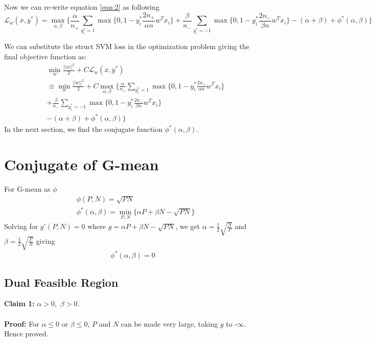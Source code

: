 \documentclass{article} %
\begin{document}
Now we can re-write equation \ref{eqn:2} as following
\begin{equation*}
\mathcal L_w(\overline{x},\overline{y}^*) = \max_{\alpha,\beta}\{
\frac{\alpha}{n_+}\sum_{y_i^*=1}\max\{0,1-y_i^*\frac{2n_+}{\alpha n}w^Tx_i\}+\frac{\beta}{n_-}\sum_{y_i^*=-1}\max\{0,1-y_i^*\frac{2n_-}{\beta n}w^Tx_i\}-(\alpha+\beta)+\phi^*(\alpha,\beta)\}
\end{equation*}

We can substitute the struct SVM loss in the optimization problem giving the final objective function as:
\begin{equation*}
\begin{split}
	&\min_w \frac{||w||^2}{2} + C \mathcal L_w(\overline{x},\overline{y}^*)\\
	&\equiv \min_w \frac{||w||^2}{2} + C\max_{\alpha,\beta}\{
	\frac{\alpha}{n_+}\sum_{y_i^*=1}\max\{0,1-y_i^*\frac{2n_+}{\alpha n}w^Tx_i\}\\
	&+ \frac{\beta}{n_-}\sum_{y_i^*=-1}\max\{0,1-y_i^*\frac{2n_-}{\beta n}w^Tx_i\}\\
	&-(\alpha+\beta)+\phi^*(\alpha,\beta)\}
\end{split}
\end{equation*}
In the next section, we find the conjugate function $\phi^*(\alpha,\beta)$.
\section{Conjugate of G-mean}
For G-mean as $\phi$
\begin{align*}
&\phi(P,N)=\sqrt{PN}\\
&\phi^*(\alpha,\beta) = \min_{P,N}\{\alpha P+\beta N-\sqrt{PN}\}
\end{align*}	
Solving for $g'(P,N)=0$ where $g=\alpha P+\beta N-\sqrt{PN}$, we get $\alpha=\frac{1}{2}\sqrt{\frac{N}{P}}$ and $\beta=\frac{1}{2}\sqrt{\frac{P}{N}}$ giving
\begin{equation}
\phi^*(\alpha,\beta)=0
\end{equation}

\subsection{Dual Feasible Region}
\textbf{Claim 1:} $\alpha > 0,$ $\beta > 0$.\\ \\
\textbf{Proof:} For $\alpha \leq 0$ or $\beta \leq 0$, $P$ and $N$ can be made very large, taking $g$ to -$\infty$. Hence proved.
\end{document}

